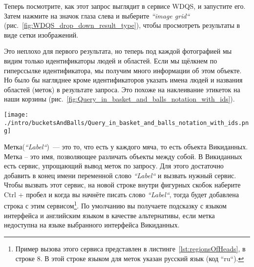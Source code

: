 \newpage Теперь посмотрите, как этот запрос выглядит в сервисе WDQS, и запустите его. Затем нажмите на значок глаза слева и выберите \textit{``image grid``} (рис.~\ref{fig:WDQS_drop_down_result_type}), чтобы просмотреть результаты в виде сетки изображений.

\begin{marginfigure}
	{
		\setlength{\fboxsep}{0pt}%
		\setlength{\fboxrule}{1pt}%
	}
    \caption[Выбор отображения результатов запроса в виде сетки изображений.]{Выбор отображения результатов запроса в виде \textit{``image grid``} (сетки изображений).}
	\label{fig:WDQS_drop_down_result_type}
\end{marginfigure}

Это неплохо для первого результата, но теперь под каждой фотографией мы видим только идентификаторы людей и областей. Если мы щёлкнем по гиперссылке идентификатора, мы получим много информации об этом объекте. Но было бы нагляднее кроме идентификаторов указать имена людей и названия областей (меток) в результате запроса. Это похоже на наклеивание этикеток на наши корзины (рис.~\ref{fig:Query_in_basket_and_balls_notation_with_ids}).

\begin{figure*}[h!]
\texttt{[image: ./intro/bucketsAndBalls/Query\_in\_basket\_and\_balls\_notation\_with\_ids.png]}
\caption{Запрос в нотации <<Корзины и мячи>> с номерами свойств и объектов Викиданных.}
\label{fig:Query_in_basket_and_balls_notation_with_ids}
\end{figure*}

Метка(\textit{``Label``})~--- это то, что есть у каждого мяча, то есть объекта Викиданных. Метка – это имя, позволяющее различать объекты между собой. В Викиданных есть сервис, упрощающий вывод меток по запросу. Для этого достаточно добавить в конец имени переменной слово \textit{``Label``} и вызвать нужный сервис. Чтобы вызвать этот сервис, на новой строке внутри фигурных скобок наберите Ctrl + пробел и когда вы начнёте писать слово \textit{``Label``}, тогда будет добавлена строка с этим сервисом\footnote[][12pt]{Пример вызова этого сервиса представлен в листинге~\ref{lst:regionsOfHeads}, в строке 8. В этой строке языком для меток указан русский язык (код ``ru``).}. По умолчанию вы получаете подсказку с языком интерфейса и английским языком в качестве альтернативы, если метка недоступна на языке выбранного интерфейса Викиданных.

